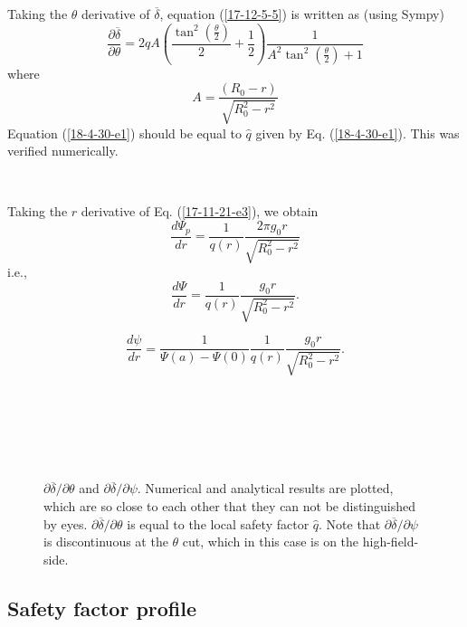 \documentclass{article}
\begin{document}
Taking the $\theta$ derivative of $\overline{\delta}$, equation
(\ref{17-12-5-5}) is written as (using Sympy)
\begin{equation}
  \frac{\partial \overline{\delta}}{\partial \theta} = 2 q A \left(
  \frac{\tan^2 \left( \frac{\theta}{2} \right)}{2} + \frac{1}{2} \right)
  \frac{1}{A^2 \tan^2 \left( \frac{\theta}{2} \right) + 1}
\end{equation}
where
\begin{equation}
  A = \frac{(R_0 - r)}{\sqrt{R_0^2 - r^2}}
\end{equation}
Equation (\ref{18-4-30-e1}) should be equal to $\hat{q}$ given by Eq.
(\ref{18-4-30-e1}). This was verified numerically.

\

Taking the $r$ derivative of Eq. (\ref{17-11-21-e3}), we obtain
\begin{equation}
  \frac{d \Psi_p}{d r} = \frac{1}{q (r)}  \frac{2 \pi g_0 r}{\sqrt{R_0^2 -
  r^2}}
\end{equation}
i.e.,
\begin{equation}
  \frac{d \Psi}{d r} = \frac{1}{q (r)}  \frac{g_0 r}{\sqrt{R_0^2 - r^2}} .
\end{equation}

\begin{equation}
  \frac{d \psi}{d r} = \frac{1}{\Psi (a) - \Psi (0)}  \frac{1}{q (r)} 
  \frac{g_0 r}{\sqrt{R_0^2 - r^2}} .
\end{equation}


\

\

\begin{figure}[h]
  
  \
  \caption{$\partial \overline{\delta} / \partial \theta$ and $\partial
  \overline{\delta} / \partial \psi$. Numerical and analytical results are
  plotted, which are so close to each other that they can not be distinguished
  by eyes. $\partial \overline{\delta} / \partial \theta$ is equal to the
  local safety factor $\hat{q}$. Note that $\partial \overline{\delta} /
  \partial \psi$ is discontinuous at the $\theta$ cut, which in this case is
  on the high-field-side.}
\end{figure}

\subsection{Safety factor profile}
\end{document}
